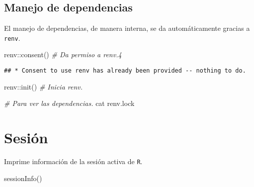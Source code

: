 \documentclass[
]{book}
\newenvironment{Shaded}{\begin{snugshade}}{\end{snugshade}}
\newcommand{\CommentTok}[1]{\textcolor[rgb]{0.56,0.35,0.01}{\textit{#1}}}
\newcommand{\FunctionTok}[1]{\textcolor[rgb]{0.00,0.00,0.00}{#1}}
\newcommand{\NormalTok}[1]{#1}
\newcommand{\SpecialCharTok}[1]{\textcolor[rgb]{0.00,0.00,0.00}{#1}}
\theoremstyle{definition}
\theoremstyle{definition}
\theoremstyle{definition}
\theoremstyle{definition}
\theoremstyle{remark}
\begin{document}
\hypertarget{manejo-de-dependencias}{%
\subsection{Manejo de dependencias}\label{manejo-de-dependencias}}

El manejo de dependencias, de manera interna, se da automáticamente gracias a \texttt{renv}.

\begin{Shaded}
\begin{Highlighting}[]
\NormalTok{renv}\SpecialCharTok{::}\FunctionTok{consent}\NormalTok{() }\CommentTok{\# Da permiso a renv.4}
\end{Highlighting}
\end{Shaded}

\begin{verbatim}
## * Consent to use renv has already been provided -- nothing to do.
\end{verbatim}

\begin{Shaded}
\begin{Highlighting}[]
\NormalTok{renv}\SpecialCharTok{::}\FunctionTok{init}\NormalTok{() }\CommentTok{\# Inicia renv.}
\end{Highlighting}
\end{Shaded}

\begin{Shaded}
\begin{Highlighting}[]
\CommentTok{\# Para ver las dependencias.}
\FunctionTok{cat}\NormalTok{ renv.lock}
\end{Highlighting}
\end{Shaded}

\hypertarget{sesiuxf3n}{%
\section{Sesión}\label{sesiuxf3n}}

Imprime información de la sesión activa de \texttt{R}.

\begin{Shaded}
\begin{Highlighting}[]
\FunctionTok{sessionInfo}\NormalTok{()}
\end{Highlighting}
\end{Shaded}
\end{document}
